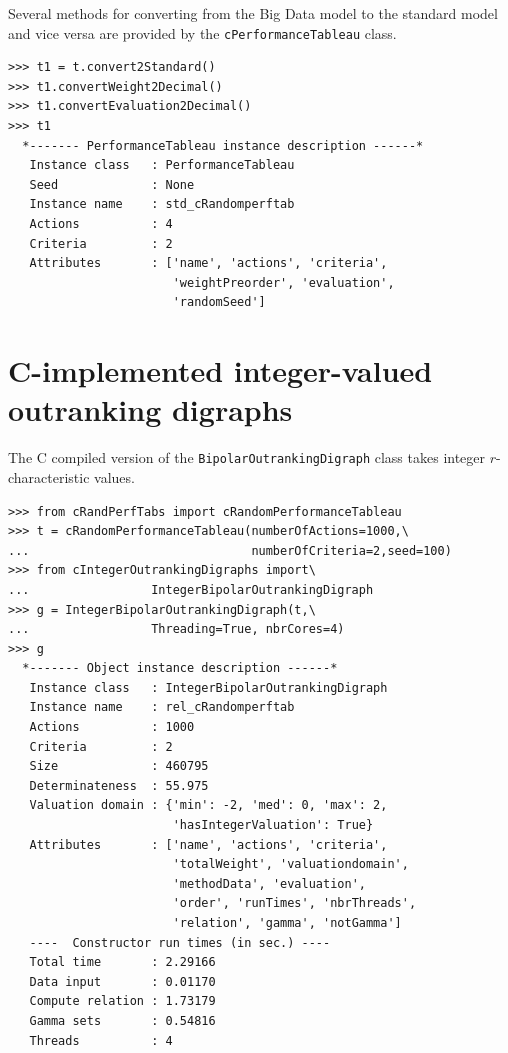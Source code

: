 Several methods for converting from the Big Data model to the standard model and vice versa are provided by the \texttt{cPerformanceTableau} class.
\begin{lstlisting}   
>>> t1 = t.convert2Standard()
>>> t1.convertWeight2Decimal()
>>> t1.convertEvaluation2Decimal()
>>> t1
  *------- PerformanceTableau instance description ------*
   Instance class   : PerformanceTableau
   Seed             : None
   Instance name    : std_cRandomperftab
   Actions          : 4
   Criteria         : 2
   Attributes       : ['name', 'actions', 'criteria',
                       'weightPreorder', 'evaluation',
                       'randomSeed']
\end{lstlisting}

\section{C-implemented integer-valued outranking digraphs}
\label{sec:11.3}

The C compiled version of the \texttt{BipolarOutrankingDigraph} class takes integer $r$-characteristic values.
\begin{lstlisting}[caption={Constructing big bipolar-valued outranking digraphs},label=list:11.2]
>>> from cRandPerfTabs import cRandomPerformanceTableau
>>> t = cRandomPerformanceTableau(numberOfActions=1000,\
...                               numberOfCriteria=2,seed=100)
>>> from cIntegerOutrankingDigraphs import\
...                 IntegerBipolarOutrankingDigraph
>>> g = IntegerBipolarOutrankingDigraph(t,\
...                 Threading=True, nbrCores=4)
>>> g
  *------- Object instance description ------*
   Instance class   : IntegerBipolarOutrankingDigraph
   Instance name    : rel_cRandomperftab
   Actions          : 1000
   Criteria         : 2
   Size             : 460795
   Determinateness  : 55.975
   Valuation domain : {'min': -2, 'med': 0, 'max': 2,
                       'hasIntegerValuation': True}
   Attributes       : ['name', 'actions', 'criteria',
                       'totalWeight', 'valuationdomain',
                       'methodData', 'evaluation',
                       'order', 'runTimes', 'nbrThreads',
                       'relation', 'gamma', 'notGamma']
   ----  Constructor run times (in sec.) ----
   Total time       : 2.29166
   Data input       : 0.01170
   Compute relation : 1.73179
   Gamma sets       : 0.54816
   Threads          : 4
\end{lstlisting}

